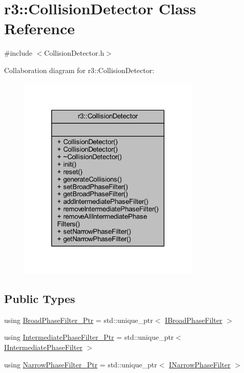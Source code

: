 \hypertarget{classr3_1_1_collision_detector}{}\section{r3\+:\+:Collision\+Detector Class Reference}
\label{classr3_1_1_collision_detector}


{\ttfamily \#include $<$Collision\+Detector.\+h$>$}



Collaboration diagram for r3\+:\+:Collision\+Detector\+:\nopagebreak
\begin{figure}[H]
\begin{center}
\leavevmode
\includegraphics[width=245pt]{classr3_1_1_collision_detector__coll__graph}
\end{center}
\end{figure}
\subsection*{Public Types}
\begin{DoxyCompactItemize}
\item 
using \mbox{\hyperlink{classr3_1_1_collision_detector_aa8ed51d53c6f6ce545c93ad0e356d6de}{Broad\+Phase\+Filter\+\_\+\+Ptr}} = std\+::unique\+\_\+ptr$<$ \mbox{\hyperlink{classr3_1_1_i_broad_phase_filter}{I\+Broad\+Phase\+Filter}} $>$
\item 
using \mbox{\hyperlink{classr3_1_1_collision_detector_a8337c2c23ec77350b65977e043c07827}{Intermediate\+Phase\+Filter\+\_\+\+Ptr}} = std\+::unique\+\_\+ptr$<$ \mbox{\hyperlink{classr3_1_1_i_intermediate_phase_filter}{I\+Intermediate\+Phase\+Filter}} $>$
\item 
using \mbox{\hyperlink{classr3_1_1_collision_detector_a094cc287cba14d5a063cfca41e667008}{Narrow\+Phase\+Filter\+\_\+\+Ptr}} = std\+::unique\+\_\+ptr$<$ \mbox{\hyperlink{classr3_1_1_i_narrow_phase_filter}{I\+Narrow\+Phase\+Filter}} $>$
\end{DoxyCompactItemize}
